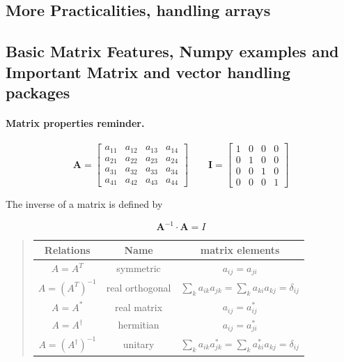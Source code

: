 \documentclass[%
oneside,                 %
final,                   %
10pt]{article}
\begin{document}
\noindent
\subsection*{More Practicalities, handling arrays}


\subsection*{Basic Matrix Features, Numpy examples and Important Matrix and vector handling packages}


\paragraph{Matrix properties reminder.}
\[
 \mathbf{A} =
      \begin{bmatrix} a_{11} & a_{12} & a_{13} & a_{14} \\
                                 a_{21} & a_{22} & a_{23} & a_{24} \\
                                   a_{31} & a_{32} & a_{33} & a_{34} \\
                                  a_{41} & a_{42} & a_{43} & a_{44}
             \end{bmatrix}\qquad
\mathbf{I} =
      \begin{bmatrix} 1 & 0 & 0 & 0 \\
                                 0 & 1 & 0 & 0 \\
                                 0 & 0 & 1 & 0 \\
                                 0 & 0 & 0 & 1
             \end{bmatrix}
\]



The inverse of a matrix is defined by

\[
\mathbf{A}^{-1} \cdot \mathbf{A} = I
\]



\begin{quote}
\begin{tabular}{ccc}
\hline
\multicolumn{1}{c}{ Relations } & \multicolumn{1}{c}{ Name } & \multicolumn{1}{c}{ matrix elements } \\
\hline
$A = A^{T}$                            & symmetric       & $a_{ij} = a_{ji}$                                                       \\
$A = \left (A^{T} \right )^{-1}$       & real orthogonal & $\sum_k a_{ik} a_{jk} = \sum_k a_{ki} a_{kj} = \delta_{ij}$             \\
$A = A^{ * }$                          & real matrix     & $a_{ij} = a_{ij}^{ * }$                                                 \\
$A = A^{\dagger}$                      & hermitian       & $a_{ij} = a_{ji}^{ * }$                                                 \\
$A = \left (A^{\dagger} \right )^{-1}$ & unitary         & $\sum_k a_{ik} a_{jk}^{ * } = \sum_k a_{ki}^{ * } a_{kj} = \delta_{ij}$ \\
\hline
\end{tabular}
\end{quote}
\end{document}
